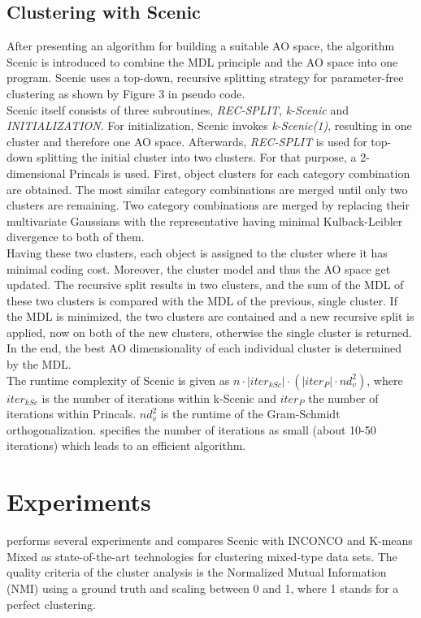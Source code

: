 \documentclass[conference]{IEEEtran}
\begin{document}
\subsection{Clustering with Scenic}
After presenting an algorithm for building a suitable AO space, the algorithm Scenic is introduced to combine the MDL principle and the AO space into one program. Scenic uses a top-down, recursive splitting strategy for parameter-free clustering as shown by Figure 3 \cite{scenic} in pseudo code.
\\
Scenic itself consists of three subroutines, \textit{REC-SPLIT}, \textit{k-Scenic} and \textit{INITIALIZATION}. For initialization, Scenic invokes \textit{k-Scenic(1)}, resulting in one cluster and therefore one AO space. Afterwards, \textit{REC-SPLIT} is used for top-down splitting the initial cluster into two clusters. For that purpose, a 2-dimensional Princals is used. First, object clusters for each category combination are obtained. The most similar category combinations are merged until only two clusters are remaining. Two category combinations are merged by replacing their multivariate Gaussians with the representative having minimal Kulback-Leibler divergence to both of them. 
\\
Having these two clusters, each object is assigned to the cluster where it has minimal coding cost. Moreover, the cluster model and thus the AO space get updated. The recursive split results in two clusters, and the sum of the MDL of these two clusters is compared with the MDL of the previous, single cluster. If the MDL is minimized, the two clusters are contained and a new recursive split is applied, now on both of the new clusters, otherwise the single cluster is returned. In the end, the best AO dimensionality of each individual cluster is determined by the MDL.
\\
The runtime complexity of Scenic is given as $n \cdot |iter_{kSc}| \cdot (|iter_P| \cdot nd_v^2 )$, where $iter_{kSc}$ is the number of iterations within k-Scenic and $iter_P$ the number of iterations within Princals. $nd_v^2$ is the runtime of the Gram-Schmidt orthogonalization. \cite{scenic} specifies the number of iterations as small (about 10-50 iterations) which leads to an efficient algorithm.

\section{Experiments}
\cite{scenic} performs several experiments and compares Scenic with INCONCO and K-means Mixed as state-of-the-art technologies for clustering mixed-type data sets. The quality criteria of the cluster analysis is the Normalized Mutual Information (NMI)\cite{nmi} using a ground truth and scaling between 0 and 1, where 1 stands for a perfect clustering.
\end{document}
